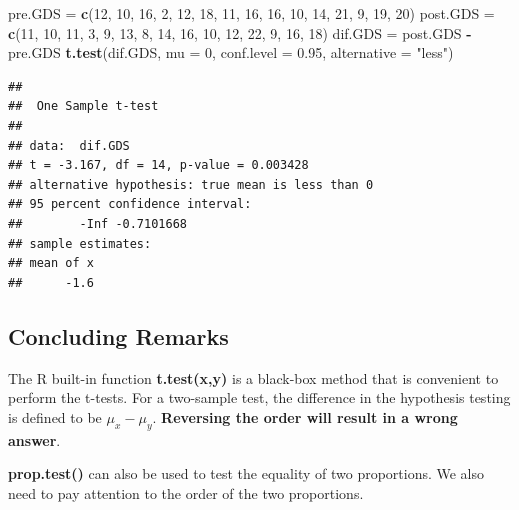 \documentclass[
]{book}
\newenvironment{Shaded}{\begin{snugshade}}{\end{snugshade}}
\newcommand{\AttributeTok}[1]{\textcolor[rgb]{0.13,0.29,0.53}{#1}}
\newcommand{\DecValTok}[1]{\textcolor[rgb]{0.00,0.00,0.81}{#1}}
\newcommand{\FloatTok}[1]{\textcolor[rgb]{0.00,0.00,0.81}{#1}}
\newcommand{\FunctionTok}[1]{\textcolor[rgb]{0.13,0.29,0.53}{\textbf{#1}}}
\newcommand{\NormalTok}[1]{#1}
\newcommand{\OtherTok}[1]{\textcolor[rgb]{0.56,0.35,0.01}{#1}}
\newcommand{\SpecialCharTok}[1]{\textcolor[rgb]{0.81,0.36,0.00}{\textbf{#1}}}
\newcommand{\StringTok}[1]{\textcolor[rgb]{0.31,0.60,0.02}{#1}}
\begin{document}
\begin{Shaded}
\begin{Highlighting}[]
\NormalTok{pre.GDS }\OtherTok{=} \FunctionTok{c}\NormalTok{(}\DecValTok{12}\NormalTok{, }\DecValTok{10}\NormalTok{, }\DecValTok{16}\NormalTok{, }\DecValTok{2}\NormalTok{, }\DecValTok{12}\NormalTok{, }\DecValTok{18}\NormalTok{, }\DecValTok{11}\NormalTok{, }\DecValTok{16}\NormalTok{, }\DecValTok{16}\NormalTok{, }\DecValTok{10}\NormalTok{, }\DecValTok{14}\NormalTok{, }\DecValTok{21}\NormalTok{, }\DecValTok{9}\NormalTok{, }\DecValTok{19}\NormalTok{, }\DecValTok{20}\NormalTok{)}
\NormalTok{post.GDS }\OtherTok{=} \FunctionTok{c}\NormalTok{(}\DecValTok{11}\NormalTok{, }\DecValTok{10}\NormalTok{, }\DecValTok{11}\NormalTok{, }\DecValTok{3}\NormalTok{,  }\DecValTok{9}\NormalTok{, }\DecValTok{13}\NormalTok{,  }\DecValTok{8}\NormalTok{, }\DecValTok{14}\NormalTok{, }\DecValTok{16}\NormalTok{, }\DecValTok{10}\NormalTok{, }\DecValTok{12}\NormalTok{, }\DecValTok{22}\NormalTok{, }\DecValTok{9}\NormalTok{, }\DecValTok{16}\NormalTok{, }\DecValTok{18}\NormalTok{)}
\NormalTok{dif.GDS }\OtherTok{=}\NormalTok{ post.GDS }\SpecialCharTok{{-}}\NormalTok{ pre.GDS}
\FunctionTok{t.test}\NormalTok{(dif.GDS,}
       \AttributeTok{mu =} \DecValTok{0}\NormalTok{,}
       \AttributeTok{conf.level =} \FloatTok{0.95}\NormalTok{,}
       \AttributeTok{alternative =} \StringTok{"less"}\NormalTok{)}
\end{Highlighting}
\end{Shaded}

\begin{verbatim}
## 
##  One Sample t-test
## 
## data:  dif.GDS
## t = -3.167, df = 14, p-value = 0.003428
## alternative hypothesis: true mean is less than 0
## 95 percent confidence interval:
##        -Inf -0.7101668
## sample estimates:
## mean of x 
##      -1.6
\end{verbatim}

\hypertarget{concluding-remarks}{%
\subsection{Concluding Remarks}\label{concluding-remarks}}

The R built-in function \textbf{t.test(x,y)} is a black-box method that is convenient to perform the t-tests. For a two-sample test, the difference in the hypothesis testing is defined to be \(\mu_x - \mu_y\). \textbf{Reversing the order will result in a wrong answer}.

\textbf{prop.test()} can also be used to test the equality of two proportions. We also need to pay attention to the order of the two proportions.
\end{document}
